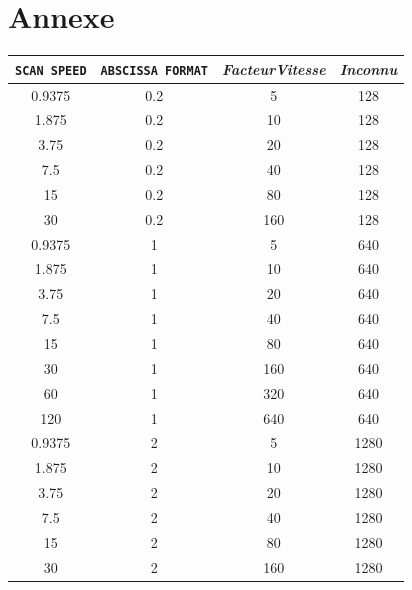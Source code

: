 \documentclass[a4paper, 12pt]{article}
\begin{document}
\newpage
\section{Annexe}\label{annexe}

		\begin{longtable}[c]{|c|c|c|c|}

\hline
\verb|SCAN SPEED| & \verb|ABSCISSA FORMAT| & \emph{FacteurVitesse} & \emph{Inconnu} \\ \hline
\endhead
%
0.9375     & 0.2             & 5              & 128     \\ \hline
1.875      & 0.2             & 10             & 128     \\ \hline
3.75       & 0.2             & 20             & 128     \\ \hline
7.5        & 0.2             & 40             & 128     \\ \hline
15         & 0.2             & 80             & 128     \\ \hline
30         & 0.2             & 160            & 128     \\ \hline
0.9375     & 1               & 5              & 640     \\ \hline
1.875      & 1               & 10             & 640     \\ \hline
3.75       & 1               & 20             & 640     \\ \hline
7.5        & 1               & 40             & 640     \\ \hline
15         & 1               & 80             & 640     \\ \hline
30         & 1               & 160            & 640     \\ \hline
60         & 1               & 320            & 640     \\ \hline
120        & 1               & 640            & 640     \\ \hline
0.9375     & 2               & 5              & 1280    \\ \hline
1.875      & 2               & 10             & 1280    \\ \hline
3.75       & 2               & 20             & 1280    \\ \hline
7.5        & 2               & 40             & 1280    \\ \hline
15         & 2               & 80             & 1280    \\ \hline
30         & 2               & 160            & 1280    \\ \hline

\end{longtable}
\end{document}

